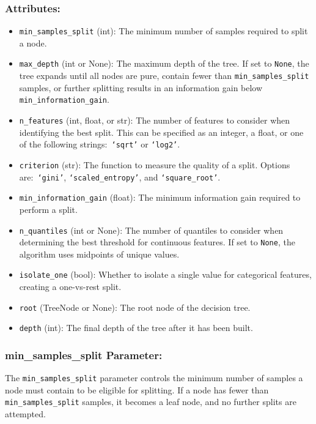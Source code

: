 \documentclass{article}
\begin{document}
\subsubsection*{Attributes:}
\begin{itemize}
    \item \texttt{min\_samples\_split} (int): The minimum number of samples required to split a node.
    \item \texttt{max\_depth} (int or None): The maximum depth of the tree. If set to \texttt{None}, the tree expands until all nodes are pure, contain fewer than \texttt{min\_samples\_split} samples, or further splitting results in an information gain below \texttt{min\_information\_gain}.
    \item \texttt{n\_features} (int, float, or str): The number of features to consider when identifying the best split. This can be specified as an integer, a float, or one of the following strings:\ \texttt{`sqrt'} or \texttt{`log2'}.
    \item \texttt{criterion} (str): The function to measure the quality of a split. Options are:\ \texttt{`gini'}, \texttt{`scaled\_entropy'}, and \texttt{`square\_root'}.
    \item \texttt{min\_information\_gain} (float): The minimum information gain required to perform a split.
    \item \texttt{n\_quantiles} (int or None): The number of quantiles to consider when determining the best threshold for continuous features. If set to \texttt{None}, the algorithm uses midpoints of unique values.
    \item \texttt{isolate\_one} (bool): Whether to isolate a single value for categorical features, creating a one-vs-rest split.
    \item \texttt{root} (TreeNode or None): The root node of the decision tree.
    \item \texttt{depth} (int): The final depth of the tree after it has been built.
\end{itemize}

\subsubsection*{min\_samples\_split Parameter:}

The \texttt{min\_samples\_split} parameter controls the minimum number of samples a node must contain to be eligible for splitting. If a node has fewer than \texttt{min\_samples\_split} samples, it becomes a leaf node, and no further splits are attempted.
\end{document}
